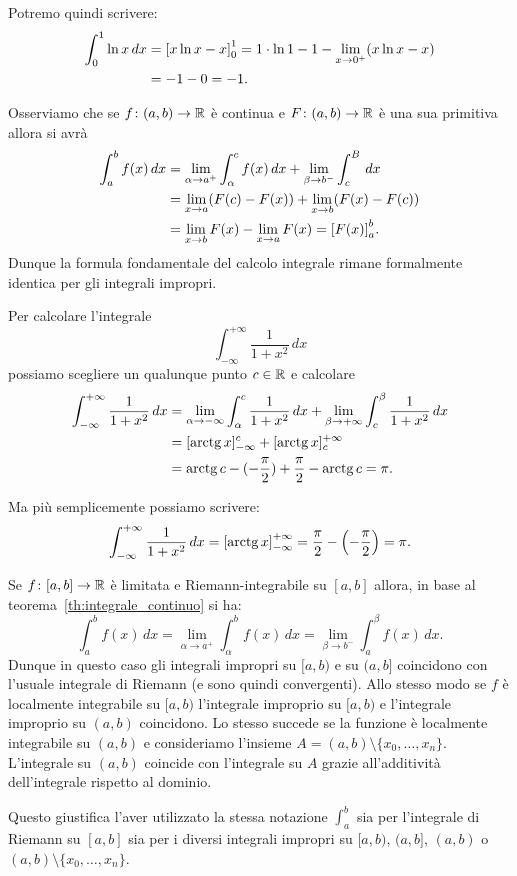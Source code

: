 Potremo quindi scrivere:
\begin{align*}
  \int_0^1 \ln x\, dx
  &= {\left[ x\ln x- x \right]}_0^1
  = 1 \cdot\ln 1 -1 - \lim_{x\to 0^+} (x\ln x - x) \\
  &= -1  - 0 = -1.
\end{align*}

Osserviamo che se $f\colon(a,b) \to \mathbb R$ è continua e $F\colon(a,b)\to \mathbb R$
è una sua primitiva
allora si avrà
\begin{align*}
  \int_a^b f(x)\, dx
   &= \lim_{\alpha\to a^+}\int_{\alpha}^c f(x)\, dx
   + \lim_{\beta\to b^-}\int_c^{B}\, dx \\
   & = \lim_{x\to a} (F(c)-F(x)) + \lim_{x\to b} (F(x)-F(c)) \\
   & = \lim_{x\to b} F(x) - \lim_{x\to a} F(x)
   = {\left[ F(x) \right]}_a^b.
\end{align*}
Dunque la formula fondamentale del calcolo integrale rimane formalmente identica
per gli integrali impropri.

\begin{example}
Per calcolare l'integrale
\[
  \int_{-\infty}^{+\infty} \frac{1}{1+x^2}\, dx
\]
possiamo scegliere un qualunque punto $c\in \mathbb R$ e calcolare
\begin{align*}
\int_{-\infty}^{+\infty}\frac{1}{1+x^2}\, dx
&=
\lim_{\alpha\to-\infty}\int_\alpha^c \frac{1}{1+x^2}\, dx
  + \lim_{\beta\to+\infty}\int_c^\beta \frac{1}{1+x^2}\, dx\\
  &= [\operatorname{arctg} x]_{-\infty}^c
  + [\operatorname{arctg} x]_c^{+\infty}  \\
  &= \operatorname{arctg} c - (-\frac\pi 2) + \frac \pi 2 - \operatorname{arctg} c
  = \pi.
\end{align*}

Ma più semplicemente possiamo scrivere:
\[
 \int_{-\infty}^{+\infty}\frac{1}{1+x^2}\, dx
 = {\left[ \operatorname{arctg} x \right]}_{-\infty}^{+\infty}
 = \frac \pi 2 - {\left( -\frac \pi 2 \right)} = \pi.
 \]

\end{example}

\begin{remark}
Se $f\colon[a,b]\to\mathbb R$ è limitata e Riemann-integrabile su
$[a,b]$ allora,
in base al teorema~\ref{th:integrale_continuo}
si ha:
\[
 \int_a^b f(x)\, dx
  = \lim_{\alpha \to a^+} \int_\alpha^b f(x)\, dx
  = \lim_{\beta\to b^-}\int_a^\beta f(x)\,dx.
\]
Dunque in questo caso gli integrali impropri su $[a,b)$ e su $(a,b]$ coincidono
con l'usuale integrale di Riemann (e sono quindi convergenti).
Allo stesso modo se $f$ è localmente integrabile su $[a,b)$
l'integrale improprio su $[a,b)$ e l'integrale improprio su
$(a,b)$ coincidono.
Lo stesso succede se la funzione è localmente integrabile
su $(a,b)$ e consideriamo l'insieme $A=(a,b)\setminus\{x_0,\dots,x_n\}$.
L'integrale su $(a,b)$ coincide con l'integrale su $A$ grazie all'additività
dell'integrale rispetto al dominio.

Questo giustifica l'aver utilizzato la stessa notazione $\int_a^b$ sia per l'integrale
di Riemann su $[a,b]$ sia per i diversi integrali impropri su $[a,b)$, $(a,b]$,
$(a,b)$ o $(a,b)\setminus\{x_0, \dots, x_n\}$.
\end{remark}

